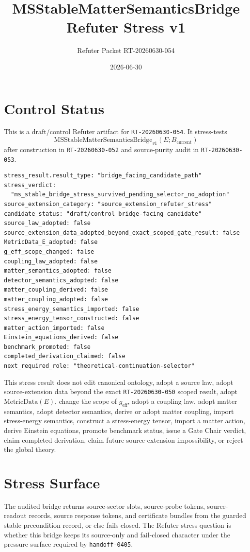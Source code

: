 \documentclass[11pt]{article}
\title{MSStableMatterSemanticsBridge Refuter Stress v1}
\author{Refuter Packet RT-20260630-054}
\date{2026-06-30}
\newcommand{\Bcur}{B_{\mathrm{current}}}
\newcommand{\MSBridge}{\mathrm{MSStableMatterSemanticsBridge}_{v1}}
\newcommand{\MetricData}{\mathrm{MetricData}}
\newcommand{\geff}{g_{\mathrm{eff}}}
\begin{document}
\maketitle

\section{Control Status}

This is a draft/control Refuter artifact for \texttt{RT-20260630-054}. It
stress-tests
\[
  \MSBridge(E;\Bcur)
\]
after construction in \texttt{RT-20260630-052} and source-purity audit in
\texttt{RT-20260630-053}.

\begin{verbatim}
stress_result.result_type: "bridge_facing_candidate_path"
stress_verdict:
  "ms_stable_bridge_stress_survived_pending_selector_no_adoption"
source_extension_category: "source_extension_refuter_stress"
candidate_status: "draft/control bridge-facing candidate"
source_law_adopted: false
source_extension_data_adopted_beyond_exact_scoped_gate_result: false
MetricData_E_adopted: false
g_eff_scope_changed: false
coupling_law_adopted: false
matter_semantics_adopted: false
detector_semantics_adopted: false
matter_coupling_derived: false
matter_coupling_adopted: false
stress_energy_semantics_imported: false
stress_energy_tensor_constructed: false
matter_action_imported: false
Einstein_equations_derived: false
benchmark_promoted: false
completed_derivation_claimed: false
next_required_role: "theoretical-continuation-selector"
\end{verbatim}

This stress result does not edit canonical ontology, adopt a source law, adopt
source-extension data beyond the exact \texttt{RT-20260630-050} scoped result,
adopt \(\MetricData(E)\), change the scope of \(\geff\), adopt a coupling law,
adopt matter semantics, adopt detector semantics, derive or adopt matter
coupling, import stress-energy semantics, construct a stress-energy tensor,
import a matter action, derive Einstein equations, promote benchmark status,
issue a Gate Chair verdict, claim completed derivation, claim future
source-extension impossibility, or reject the global theory.

\section{Stress Surface}

The audited bridge returns source-sector slots, source-probe tokens,
source-readout records, source response tokens, and certificate bundles from
the guarded stable-precondition record, or else fails closed. The Refuter
stress question is whether this bridge keeps its source-only and fail-closed
character under the pressure surface required by \texttt{handoff-0405}.
\end{document}
